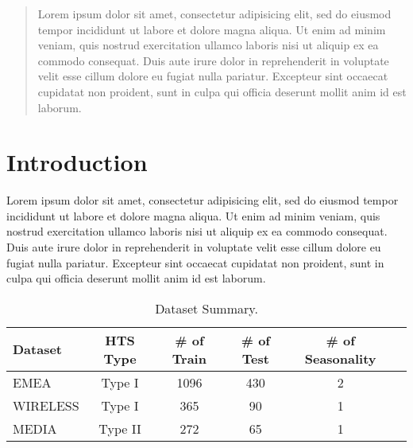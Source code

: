 \documentclass{sig-alternate}
\theoremstyle{definition}
\theoremstyle{theorem}
\theoremstyle{corollary}
\begin{document}
\maketitle
\begin{abstract}
Lorem ipsum dolor sit amet, consectetur adipisicing elit, sed do eiusmod
tempor incididunt ut labore et dolore magna aliqua. Ut enim ad minim veniam,
quis nostrud exercitation ullamco laboris nisi ut aliquip ex ea commodo
consequat. Duis aute irure dolor in reprehenderit in voluptate velit esse
cillum dolore eu fugiat nulla pariatur. Excepteur sint occaecat cupidatat non
proident, sunt in culpa qui officia deserunt mollit anim id est laborum.
\end{abstract}




\section{Introduction}
\label{sec:intro}

Lorem ipsum dolor sit amet, consectetur adipisicing elit, sed do eiusmod
tempor incididunt ut labore et dolore magna aliqua. Ut enim ad minim veniam,
quis nostrud exercitation ullamco laboris nisi ut aliquip ex ea commodo
consequat. Duis aute irure dolor in reprehenderit in voluptate velit esse
cillum dolore eu fugiat nulla pariatur. Excepteur sint occaecat cupidatat non
proident, sunt in culpa qui officia deserunt mollit anim id est laborum. \cite{liu2015regularized}

\setlength{\tabcolsep}{0.25em}
\begin{table}[!hptb]
\caption{Dataset Summary.}  
\centering
\begin{scriptsize}
\begin{tabular}{@{}lccccc@{}} \toprule
\label{tab:dataset}
Dataset  & HTS Type & \# of Train & \# of Test  & \# of Seasonality \\ \midrule 
EMEA & Type I & 1096 & 430 & 2 \\  
WIRELESS & Type I & 365 & 90 & 1 \\  
MEDIA & Type II & 272 & 65 & 1\\ \bottomrule
\end{tabular}
\end{scriptsize}
\end{table}
\end{document}
